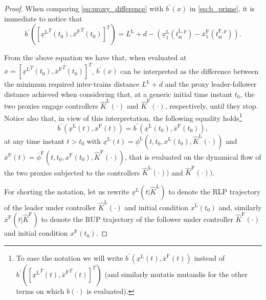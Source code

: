 \documentclass[letterpaper, 10 pt, conference]{ieeeconf}
\theoremstyle{definition}
\theoremstyle{nopoint}
\begin{document}
\begin{proof}
	When comparing \eqref{eq:proxy_difference} with $b^\prime(x)$ in \eqref{eq:b_prime}, it is immediate to notice that 
	\begin{equation}\label{eq:equality_b_prime}
		b^\prime([{\underline{x}^\mathrm{L}}^T(t_0),{\overline{x}^\mathrm{F}}^T(t_0)]^T)=L^\mathrm{L}+d-\left(\underline{x}_1^\mathrm{L}(t_{\mathrm{st}}^{\mathrm{L},p} ) -\overline{x}_1^\mathrm{F}(t_{\mathrm{st}}^{\mathrm{F},p}  )\right).
	\end{equation}
	
	From the above equation we have that, when evaluated at $x=[{\underline{x}^\mathrm{L}}^T(t_0),{\overline{x}^\mathrm{F}}^T(t_0)]^T$,  $b^\prime(x)$ can be interpreted as the difference between the minimum required inter-trains distance $L^\mathrm{L}+d$ and the proxy leader-follower distance achieved when considering that, at a generic initial time instant $t_0$, the two proxies engage controllers $\hat{K}^\mathrm{L}(\cdot)$ and $\hat{K}^\mathrm{F}(\cdot)$, respectively, until they stop. 
	Notice also that, in view of this interpretation, the following equality holds\footnote{To ease the notation we will write $b^\prime(\underline{x}^\mathrm{L}(t),\overline{x}^\mathrm{F}(t))$ instead of $b^\prime([{\underline{x}^\mathrm{L}}^T(t),{\overline{x}^\mathrm{F}}^T(t)]^T)$ (and similarly mutatis mutandis for the other terms on which $b(\cdot)$ is evaluated).}
	\begin{equation}\label{eq:constantb_prime}
		b^\prime(\underline{x}^\mathrm{L}(t),\overline{x}^\mathrm{F}(t))=b^\prime(\underline{x}^\mathrm{L}(t_0),\overline{x}^\mathrm{F}(t_0)),
	\end{equation}
	at any time instant $t>t_0$ with  $\underline{x}^\mathrm{L}(t)=\underline{\phi}^\mathrm{L}(t,t_0,x^\mathrm{L}(t_0),\hat{K}^\mathrm{L}(\cdot))$ and $\overline{x}^\mathrm{F}(t)=\overline{\phi}^\mathrm{F}(t,t_0,x^\mathrm{F}(t_0),\hat{K}^\mathrm{F}(\cdot))$, that is evaluated on the dynamical flow of the two proxies subjected to the controllers $\hat{K}^\mathrm{L}(\cdot))$ and $\hat{K}^\mathrm{F}(\cdot))$.
	
	For shorting the notation, let us rewrite $\underline{x}^\mathrm{L}(t | \hat{K}^\mathrm{L})$ to denote the RLP trajectory of the leader under controller $\hat{K}^\mathrm{L}(\cdot)$ and initial condition $x^\mathrm{L}(t_0)$ and, similarly  $\overline{x}^\mathrm{F}(t | \hat{K}^\mathrm{F})$ to denote the RUP trajectory of the follower under controller $\hat{K}^\mathrm{F}(\cdot)$ and initial condition $x^\mathrm{F}(t_0)$. 
	

\end{proof}
\end{document}

